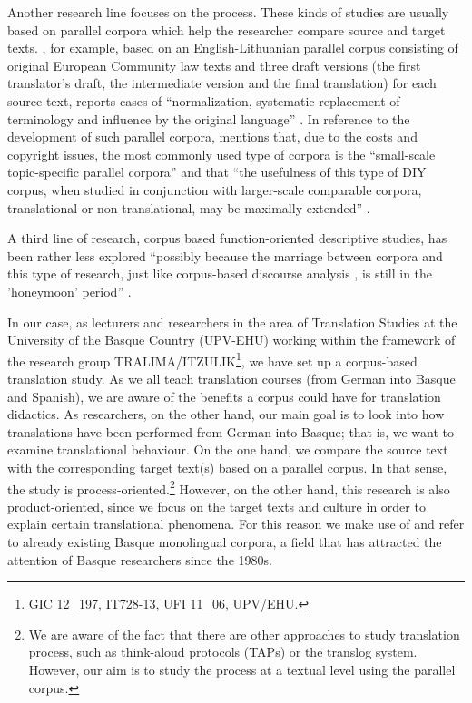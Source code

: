 \documentclass[output=paper]{LSP/langsci}
\begin{document}
Another research line focuses on the process. These kinds of studies are usually based on parallel corpora which help the researcher compare source and target texts. \citet{Utka2004}, for example, based on an English-Lithuanian parallel corpus consisting of original European Community law texts and three draft versions (the first translator's draft, the intermediate version and the final translation) for each source text, reports cases of “normalization, systematic replacement of terminology and influence by the original language” \citep[246]{Xiao2009}. In reference to the development of such parallel corpora, \citet{Ji2010} mentions that, due to the costs and copyright issues, the most commonly used type of corpora is the “small-scale topic-specific parallel corpora” \citep[6]{Ji2010} and that “the usefulness of this type of DIY corpus, when studied in conjunction with larger-scale comparable corpora, translational or non-translational, may be maximally extended” \citep[6]{Ji2010}.

A third line of research, corpus based function-oriented descriptive studies, has been rather less explored “possibly because the marriage between corpora and this type of research, just like corpus-based discourse analysis \citep[e.g.][]{Baker2006}, is still in the 'honeymoon' period” \citep[247]{Xiao2009}.

In our case, as lecturers and researchers in the area of Translation Studies at the University of the Basque Country (UPV-EHU) working within the framework of the research group TRALIMA/ITZULIK\footnote{GIC 12\_197, IT728-13, UFI 11\_06, UPV/EHU.}, we have set up a corpus-based translation study. As we all teach translation courses (from German into Basque and Spanish), we are aware of the benefits a corpus could have for translation didactics. As researchers, on the other hand, our main goal is to look into how translations have been performed from German into Basque; that is, we want to examine translational behaviour. On the one hand, we compare the source text with the corresponding target text(s) based on a parallel corpus. In that sense, the study is process-oriented.\footnote{We are aware of the fact that there are other approaches to study translation process, such as think-aloud protocols (TAPs) or the translog system. However, our aim is to study the process at a textual level using the parallel corpus.} However, on the other hand, this research is also product-oriented, since we focus on the target texts and culture in order to explain certain translational phenomena. For this reason we make use of and refer to already existing Basque monolingual corpora, a field that has attracted the attention of Basque researchers since the 1980s.
\end{document}
